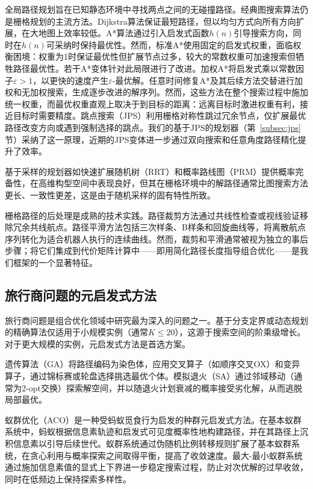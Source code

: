 \documentclass[lettersize,journal]{IEEEtran}
\begin{document}
全局路径规划旨在已知静态环境中寻找两点之间的无碰撞路径。经典图搜索算法仍是栅格规划的主流方法。Dijkstra算法保证最短路径，但以均匀方式向所有方向扩展，在大地图上效率较低\cite{ref6}。A*算法通过引入启发式函数$h(n)$引导搜索方向，同时在$h(n)$可采纳时保持最优性\cite{ref5}。然而，标准A*使用固定的启发式权重，面临权衡困境：权重为1时保证最优性但扩展节点过多，较大的常数权重可加速搜索但牺牲路径最优性。若干A*变体针对此局限进行了改进\cite{ref8}。加权A*将启发式乘以常数因子$\varepsilon > 1$，以更快的速度产生$\varepsilon$-最优解\cite{ref9}。任意时间修复A*及其后续方法交替进行加权和无加权搜索，生成逐步改进的解序列\cite{ref10}。然而，这些方法在整个搜索过程中施加统一权重，而最优权重直观上取决于到目标的距离：远离目标时激进权重有利，接近目标时需要精度。跳点搜索（JPS）利用栅格对称性跳过冗余节点，仅扩展最优路径改变方向或遇到强制选择的跳点\cite{ref11,ref12}。我们的基于JPS的规划器（第~\ref{subsec:jps} 节）采纳了这一原理，近期的JPS变体进一步通过双向搜索和任意角度路径精化提升了效率\cite{ref13,ref14,ref15}。

基于采样的规划器如快速扩展随机树（RRT）\cite{ref7}和概率路线图（PRM）提供概率完备性，在高维构型空间中表现良好，但其在栅格环境中的解路径通常比图搜索方法更长、一致性更差，这是由于随机采样的固有特性所致。

栅格路径的后处理是成熟的技术实践。路径裁剪方法通过共线性检查或视线验证移除冗余共线航点\cite{ref16}。路径平滑方法包括三次样条、B样条和回旋曲线等，将离散航点序列转化为适合机器人执行的连续曲线\cite{ref17,ref18}。然而，裁剪和平滑通常被视为独立的事后步骤；将它们集成到代价矩阵计算中——即用简化路径长度指导组合优化——是我们框架的一个显著特征。

\subsection{旅行商问题的元启发式方法}

旅行商问题是组合优化领域中研究最为深入的问题之一。基于分支定界或动态规划的精确算法仅适用于小规模实例（通常$K \leq 20$），这源于搜索空间的阶乘级增长。对于更大规模的实例，元启发式方法是首选方案。

遗传算法（GA）将路径编码为染色体，应用交叉算子（如顺序交叉OX）和变异算子，通过锦标赛或轮盘选择挑选最优个体\cite{ref19}。模拟退火（SA）通过邻域移动（通常为2-opt交换）探索解空间，并以随退火计划衰减的概率接受劣化解，从而逃脱局部最优\cite{ref20}。

蚁群优化（ACO）是一种受蚂蚁觅食行为启发的种群元启发式方法。在基本蚁群系统中，蚂蚁根据信息素轨迹和启发式可见度概率性地构建路径，并在其路径上沉积信息素以引导后续世代\cite{ref21}。蚁群系统通过伪随机比例转移规则扩展了基本蚁群系统，在贪心利用与概率探索之间取得平衡，提高了收敛速度\cite{ref22}。最大-最小蚁群系统通过施加信息素值的显式上下界进一步稳定搜索过程，防止对次优解的过早收敛，同时在低频边上保持探索多样性\cite{ref23}。
\end{document}

